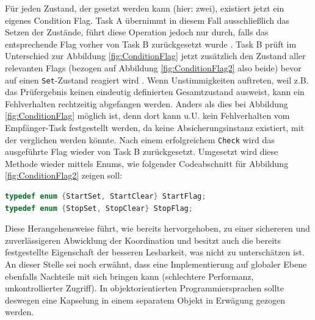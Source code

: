 \documentclass{llncs}
\begin{document}
Für jeden Zustand, der gesetzt werden kann (hier: zwei), existiert jetzt ein eigenes Condition Flag. Task A übernimmt in diesem Fall ausschließlich das Setzen der Zustände, führt diese Operation jedoch nur durch, falls das entsprechende Flag vorher von Task B zurückgesetzt wurde \autocite[vgl.][85]{Cooling2017}. Task B prüft im Unterschied zur Abbildung \ref{fig:ConditionFlag} jetzt zusätzlich den Zustand aller relevanten Flags (bezogen auf Abbildung \ref{fig:ConditionFlag2} also beide) bevor auf einen \texttt{Set}-Zustand reagiert wird \autocite[vgl.][85]{Cooling2017}. Wenn Unstimmigkeiten auftreten, weil z.B. das Prüfergebnis keinen eindeutig definierten Gesamtzustand ausweist, kann ein Fehlverhalten rechtzeitig abgefangen werden. Anders als dies bei Abbildung \ref{fig:ConditionFlag} möglich ist, denn dort kann u.U. kein Fehlverhalten vom Empfänger-Task festgestellt werden, da keine Absicherungsinstanz existiert, mit der verglichen werden könnte. Nach einem erfolgreichem \texttt{Check} wird das ausgeführte Flag wieder von Task B zurückgesetzt. Umgesetzt wird diese Methode wieder mittels Enums, wie folgender Codeabschnitt für Abbildung \ref{fig:ConditionFlag2} zeigen soll:
\begin{lstlisting}[language=C]
typedef enum {StartSet, StartClear} StartFlag;
typedef enum {StopSet, StopClear} StopFlag;
\end{lstlisting}
Diese Herangehensweise führt, wie bereits hervorgehoben, zu einer sichereren und zuverlässigeren Abwicklung der Koordination und besitzt auch die bereits festgestellte Eigenschaft der besseren Lesbarkeit, was nicht zu unterschätzen ist. An dieser Stelle sei noch erwähnt, dass eine Implementierung auf globaler Ebene ebenfalls Nachteile mit sich bringen kann (schlechtere Performanz, unkontrollierter Zugriff). In objektorientierten Programmiersprachen sollte deswegen eine Kapselung in einem separatem Objekt in Erwägung gezogen werden.\\
\end{document}
